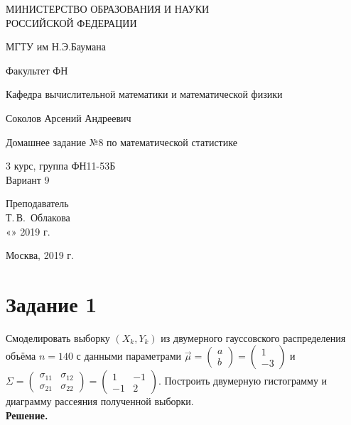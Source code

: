 \documentclass[14pt,a4paper]{scrartcl}
\begin{document}
	\begin{titlepage}
	\begin{center}
		\large
		МИНИСТЕРСТВО ОБРАЗОВАНИЯ И НАУКИ\\ РОССИЙСКОЙ ФЕДЕРАЦИИ
		
		\vspace{0.5cm}
		
		МГТУ им Н.Э.Баумана
		\vspace{0.25cm}
		
		Факультет ФН
		
		Кафедра вычислительной математики и математической физики
		\vfill
		
		
		Соколов Арсений Андреевич\\
		\vfill
		
		
		{\LARGE Домашнее задание №8 по математической статистике\\[2mm]
		}
		\bigskip
		
		3 курс, группа ФН11-53Б\\
		Вариант 9
	\end{center}
	\vfill
	
	\newlength{\ML}
	\hfill\begin{minipage}{0.4\textwidth}
		Преподаватель\\
		\underline{\hspace{3cm}} Т.\,В.~Облакова\\
		«\underline{\hspace{0.7cm}}» \underline{\hspace{1.71cm}} 2019 г.
	\end{minipage}%
	\bigskip
	
	
	\vfill
	
	\begin{center}
		Москва, 2019 г.
	\end{center}
\end{titlepage}

\section*{Задание 1}


Смоделировать выборку $(X_k, Y_k)$ из двумерного гауссовского распределения объёма $n=140$ с данными параметрами $\vec{\mu} = \begin{pmatrix} a \\ b \end{pmatrix} = \begin{pmatrix} 1 \\ -3 \end{pmatrix}$ и $\Sigma = \begin{pmatrix}
\sigma_{11} & \sigma_{12}\\
\sigma_{21} & \sigma_{22}
\end{pmatrix} =  \begin{pmatrix}
1 & -1\\
-1 & 2
\end{pmatrix}$. Построить двумерную гистограмму и диаграмму рассеяния полученной выборки.\\
\textbf{Решение.}\\
\end{document}
